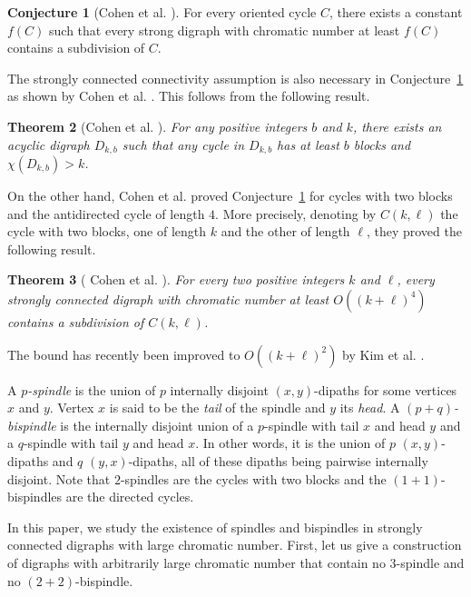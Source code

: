 \documentclass[utf8,10pt]{article}
\theoremstyle{plain}
\newtheorem{theorem}{Theorem}
\theoremstyle{definition}
\newtheorem{conjecture}[theorem]{Conjecture}
\theoremstyle{remark}
\begin{document}
\begin{conjecture}[Cohen et al.  \cite{CHLN16}]\label{conj:cycle-sub}
For every oriented cycle $C$, there exists a constant $f(C)$ such that every strong digraph with chromatic number at least $f(C)$ contains a subdivision of $C$.
\end{conjecture}

The strongly connected connectivity assumption is also necessary in Conjecture~\ref{conj:cycle-sub} as shown by Cohen et al.  \cite{CHLN16}. This follows from  the following result.
\begin{theorem}[Cohen et al.  \cite{CHLN16}]\label{dkb}
For any positive integers $b$ and $k$, there exists an acyclic digraph $D_{k,b}$ such that any cycle in $D_{k,b}$ has at least $b$ blocks and $\chi(D_{k,b}) > k$.
\end{theorem}




On the other hand, Cohen et al.  \cite{CHLN16} proved Conjecture~\ref{conj:cycle-sub} for cycles with two blocks and the antidirected cycle of length $4$.
More precisely, denoting by $C(k,\ell)$ the cycle with two blocks, one of length $k$ and the other of length $\ell$,
they proved the following result.
\begin{theorem}[ Cohen et al. \cite{CHLN16}]\label{th:ckl}
For every two positive integers $k$ and $\ell$, every strongly connected digraph with chromatic number at least $O((k+\ell)^4)$ contains a subdivision of $C(k,\ell)$.
\end{theorem} 
The bound has recently been improved to $O((k+\ell)^2)$  by Kim et al. \cite{KKPM}.  


\medskip

A {\it $p$-spindle} is the union of $p$ internally disjoint $(x,y)$-dipaths for some vertices $x$ and $y$. Vertex $x$ is said to be the {\it tail} of the spindle and $y$ its {\it head}.
A {\it $(p+q)$-bispindle} is the internally disjoint union of a $p$-spindle
with tail $x$ and head $y$ and a  $q$-spindle with tail $y$ and head $x$.
In other words, it is the union of $p$  $(x,y)$-dipaths and $q$ $(y,x)$-dipaths, all of these dipaths being pairwise internally disjoint.
Note that $2$-spindles are the cycles with two blocks and the $(1+1)$-bispindles are the directed cycles.

In this paper, we study the existence of spindles and bispindles in strongly connected digraphs with large chromatic number.
First, let us give a construction of digraphs with arbitrarily large chromatic number that contain no $3$-spindle and no $(2+2)$-bispindle. 
\end{document}
